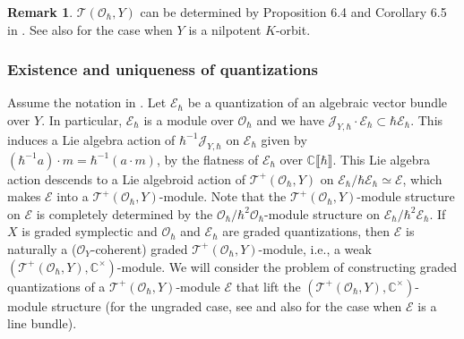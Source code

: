 \documentclass[11pt, a4paper]{amsart}
\newcommand{\C}{\mathbb{C}}
\newcommand{\J}{\mathcal{J}}
\newcommand{\cE}{\mathcal{E}}
\newcommand{\hb}{\hbar}
\newcommand{\series}{\llbracket \hb \rrbracket}
\newcommand{\TT}{\mathscr{T}}
\newcommand{\tatp}{\TT^+(\Q, Y)}
\newcommand{\tat}{\TT(\Q,Y)}
\newcommand{\PicAlg}{\mathscr{PA}}
\newcommand{\quan}{\mathcal{Q}}
\newcommand{\per}{\operatorname{Per}}
\newcommand{\cm}{\C^\times}
\newcommand{\OO}{\mathcal{O}}
\newcommand{\Q}{\OO_\hb}
\theoremstyle{definition}
\newtheorem{Rem}[Thm]{Remark}
\numberwithin{equation}{section}
\begin{document}
\begin{Rem}
	$\TT(\OO_\hb, Y)$ can be determined by Proposition 6.4 and Corollary 6.5 in \cite{Yu:period}. See also \cite[(7.6)]{Yu:period} for the case when $Y$ is a nilpotent $K$-orbit.
\end{Rem}

\subsubsection{Existence and uniqueness of quantizations} \label{subsubsec:lag_vec}

Assume the notation in . Let $\cE_\hb$ be a quantization of an algebraic vector bundle over $Y$. In particular, $\cE_\hb$ is a module over $\OO_\hb$ and we have $\J_{Y,\hb} \cdot \cE_\hb \subset \hb \cE_\hb$. This induces a Lie algebra action of $\hb^{-1} \J_{Y,\hb}$ on $\cE_\hb$ given by $(\hb^{-1} a) \cdot m = \hb^{-1}(a \cdot m)$, by the flatness of $\cE_\hb$ over $\C\series$. This Lie algebra action descends to a Lie algebroid action of $\tatp$ on $\cE_\hb / \hb \cE_\hb \simeq \cE$, which makes $\cE$ into a $\tatp$-module. Note that the $\tatp$-module structure on $\cE$ is completely determined by the $\OO_\hb / \hb^2 \OO_\hb$-module structure on $\cE_\hb / \hb^2 \cE_\hb$. 
If $X$ is graded symplectic and $\OO_\hb$ and $\cE_\hb$ are graded quantizations, then $\cE$ is naturally a ($\OO_Y$-coherent) graded $\tatp$-module, i.e., a weak $(\tatp, \cm)$-module.
We will consider the problem of constructing graded quantizations of a $\tatp$-module $\cE$ that lift the $(\tatp, \cm)$-module structure (for the ungraded case, see \cite[Theorem 1.1]{BC} and also \cite[Theorem 1.4]{BGKP} for the case when $\cE$ is a line bundle).
\end{document}

